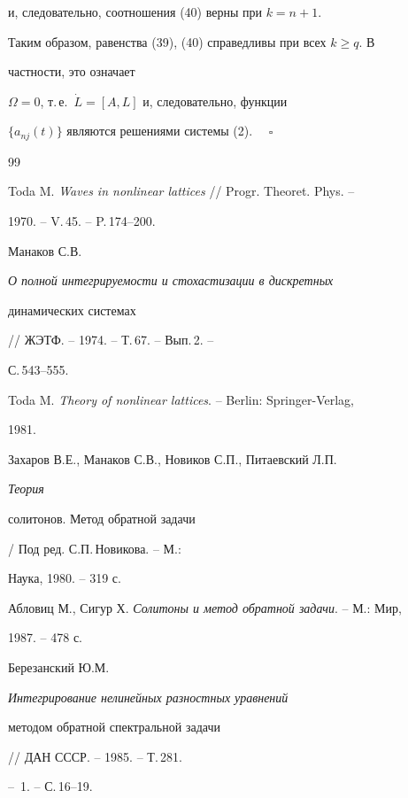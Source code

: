 и, следовательно, соотношения (40) верны при $k=n+1$. 


 


Таким образом, равенства (39), (40) справедливы при всех $k\ge q$. В 


частности, это означает


$\Omega=0$, т.\,е.~$\Dot L=[A,L]$ и, следовательно, функции 


$\{a_{nj}(t)\}$ являются решениями системы (2). $\quad\square$ 


 


 


\begin{thebibliography}{99} 


 




Toda M. {\em Waves in nonlinear lattices} // Progr. Theoret. Phys. -- 


1970. -- V.\,45. -- P.\,174--200. 




Манаков С.В. {\em О полной интегрируемости и стохастизации в дискретных 


динамических системах} // ЖЭТФ. -- 1974. -- Т.\,67. -- Вып.\,2. -- 


С.\,543--555. 




Toda M. {\em Theory of nonlinear lattices}. -- Berlin: Springer-Verlag, 


1981.




Захаров В.Е., Манаков С.В., Новиков С.П., Питаевский Л.П. {\em Теория 


солитонов. Метод обратной задачи} / Под ред. С.П.\,Новикова. -- М.: 


Наука, 1980. -- 319 с. 




Абловиц М., Сигур Х. {\em Солитоны и метод обратной задачи}. -- М.: Мир, 


1987. -- 478 с. 




Березанский Ю.М. {\em Интегрирование нелинейных разностных уравнений 


методом обратной спектральной задачи} // ДАН СССР. -- 1985. -- Т.\,281. 


-- \No\,1. -- С.\,16--19. 



\end{thebibliography}
